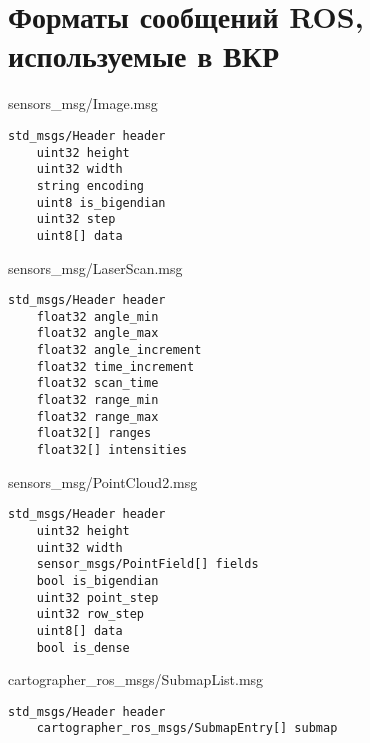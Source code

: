 \chapter{Форматы сообщений ROS, используемые в ВКР}

\begin{ListingEnv}[!h]%
    \captiondelim{ } %
    \caption{sensors\_msg/Image.msg}\label{lst:image-msg}
    \begin{lstlisting}[language={[ISO]C++}]
	std_msgs/Header header
	uint32 height
	uint32 width
	string encoding
	uint8 is_bigendian
	uint32 step
	uint8[] data
    \end{lstlisting}
\end{ListingEnv}%

\begin{ListingEnv}[!h]%
    \captiondelim{ } %
    \caption{sensors\_msg/LaserScan.msg}\label{lst:laserscan-msg}
    \begin{lstlisting}[language={[ISO]C++}]
	std_msgs/Header header
	float32 angle_min
	float32 angle_max
	float32 angle_increment
	float32 time_increment
	float32 scan_time
	float32 range_min
	float32 range_max
	float32[] ranges
	float32[] intensities
    \end{lstlisting}
\end{ListingEnv}%

\begin{ListingEnv}[!h]%
    \captiondelim{ } %
    \caption{sensors\_msg/PointCloud2.msg}\label{lst:pointcloud2-msg}
    \begin{lstlisting}[language={[ISO]C++}]
	std_msgs/Header header
	uint32 height
	uint32 width
	sensor_msgs/PointField[] fields
	bool is_bigendian
	uint32 point_step
	uint32 row_step
	uint8[] data
	bool is_dense
    \end{lstlisting}
\end{ListingEnv}%

\begin{ListingEnv}[!h]%
    \captiondelim{ } %
    \caption{cartographer\_ros\_msgs/SubmapList.msg}\label{lst:submap-list-msg}
    \begin{lstlisting}[language={[ISO]C++}]
	std_msgs/Header header
	cartographer_ros_msgs/SubmapEntry[] submap
    \end{lstlisting}
\end{ListingEnv}%

